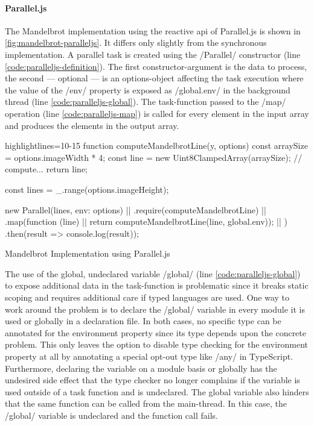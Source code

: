 \paragraph{Parallel.js}
The Mandelbrot implementation using the reactive api of Parallel.js is shown in \cref{fig:mandelbrot-paralleljs}. It differs only slightly from the synchronous implementation. A parallel task is created using the \javascriptinline/Parallel/ constructor (line \ref{code:paralleljs-definition}). The first constructor-argument is the data to process, the second --- optional ---  is an options-object affecting the task execution where the value of the \javascriptinline/env/ property is exposed as \javascriptinline/global.env/ in the background thread (line \ref{code:paralleljs-global}). The task-function passed to the \javascriptinline/map/ operation (line \ref{code:paralleljs-map}) is called for every element in the input array and produces the elements in the output array.

\begin{listing}
	\begin{javascriptcode*}{highlightlines={10-15}}
function computeMandelbrotLine(y, options) {
	const arraySize = options.imageWidth * 4;
	const line = new Uint8ClampedArray(arraySize);
	// compute...
	return line;
}

const lines = _.range(options.imageHeight);

new Parallel(lines, {env: options}) |$\label{code:paralleljs-definition}$|
	.require(computeMandelbrotLine)  |$\label{code:paralleljs-require}$|
	.map(function (line) { |$\label{code:paralleljs-map}$|
		return computeMandelbrotLine(line, global.env)); |$\label{code:paralleljs-global}$|
	})
	.then(result => console.log(result));
\end{javascriptcode*}

\caption{Mandelbrot Implementation using Parallel.js}
\label{fig:mandelbrot-paralleljs}
\end{listing}


The use of the global, undeclared variable \javascriptinline/global/ (line \ref{code:paralleljs-global}) to expose additional data in the task-function is problematic since it breaks static scoping and requires additional care if typed languages are used. One way to work around the problem is to declare the \javascriptinline/global/ variable in every module it is used or globally in a declaration file. In both cases, no specific type can be annotated for the environment property since its type depends upon the concrete problem. This only leaves the option to disable type checking for the environment property at all by annotating a special opt-out type like \javascriptinline/any/ in TypeScript. Furthermore, declaring the variable on a module basis or globally has the undesired side effect that the type checker no longer complains if the variable is used outside of a task function and is undeclared. The global variable also hinders that the same function can be called from the main-thread. In this case, the \javascriptinline/global/ variable is undeclared and the function call fails.

